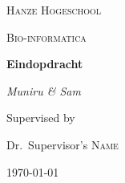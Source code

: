 \thispagestyle{empty}
\begin{center}
   \vspace*{1cm}
   {\scshape\LARGE Hanze Hogeschool \par}
   \vspace{1cm}
   {\scshape\Large Bio-informatica\par}
   \vspace{3cm}
   {\huge\bfseries Eindopdracht\par}
   \vspace{2cm}
   {\Large\itshape Muniru \& Sam\par}
   \vfill
   Supervised by\par
   Dr.~Supervisor's \textsc{Name}
   \vfill
   {\large \today\par}
\end{center}
\newpage

\setcounter{page}{1}